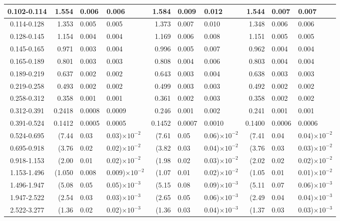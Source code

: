 \begin{table}[h]
{\begin{tabular}{ | c | r@{$\pm$}l@{$\pm$}l | r@{$\pm$}l@{$\pm$}l |  r@{$\pm$}l@{$\pm$}l |  }
0.102-0.114 & 1.554&0.006&0.006 & 1.584&0.009&0.012 & 1.544&0.007&0.007 \\ \hline
0.114-0.128 & 1.353&0.005&0.005 & 1.373&0.007&0.010 & 1.348&0.006&0.006 \\ \hline
0.128-0.145 & 1.154&0.004&0.004 & 1.169&0.006&0.008 & 1.151&0.005&0.005 \\ \hline
0.145-0.165 & 0.971&0.003&0.004 & 0.996&0.005&0.007 & 0.962&0.004&0.004 \\ \hline
0.165-0.189 & 0.801&0.003&0.003 & 0.808&0.004&0.006 & 0.803&0.004&0.004 \\ \hline
0.189-0.219 & 0.637&0.002&0.002 & 0.643&0.003&0.004 & 0.638&0.003&0.003 \\ \hline
0.219-0.258 & 0.493&0.002&0.002 & 0.499&0.003&0.003 & 0.492&0.002&0.002 \\ \hline
0.258-0.312 & 0.358&0.001&0.001 & 0.361&0.002&0.003 & 0.358&0.002&0.002 \\ \hline
0.312-0.391 & 0.2418&0.0008&0.0009 & 0.246&0.001&0.002 & 0.241&0.001&0.001 \\ \hline
0.391-0.524 & 0.1412&0.0005&0.0005 & 0.1452&0.0007&0.0010 & 0.1400&0.0006&0.0006 \\ \hline
0.524-0.695 & (7.44&0.03&0.03)$\times 10^{-2}$ & (7.61&0.05&0.06)$\times 10^{-2}$ & (7.41&0.04&0.04)$\times 10^{-2}$ \\ \hline
0.695-0.918 & (3.76&0.02&0.02)$\times 10^{-2}$ & (3.82&0.03&0.04)$\times 10^{-2}$ & (3.76&0.03&0.03)$\times 10^{-2}$ \\ \hline
0.918-1.153 & (2.00&0.01&0.02)$\times 10^{-2}$ & (1.98&0.02&0.03)$\times 10^{-2}$ & (2.02&0.02&0.02)$\times 10^{-2}$ \\ \hline
1.153-1.496 & (1.050&0.008&0.009)$\times 10^{-2}$ & (1.07&0.01&0.02)$\times 10^{-2}$ & (1.05&0.01&0.01)$\times 10^{-2}$ \\ \hline
1.496-1.947 & (5.08&0.05&0.05)$\times 10^{-3}$ & (5.15&0.08&0.09)$\times 10^{-3}$ & (5.11&0.07&0.06)$\times 10^{-3}$ \\ \hline
1.947-2.522 & (2.54&0.03&0.03)$\times 10^{-3}$ & (2.65&0.05&0.06)$\times 10^{-3}$ & (2.49&0.04&0.04)$\times 10^{-3}$ \\ \hline
2.522-3.277 & (1.36&0.02&0.02)$\times 10^{-3}$ & (1.36&0.03&0.04)$\times 10^{-3}$ & (1.37&0.03&0.03)$\times 10^{-3}$ \\ \hline
\end{tabular}}
\end{table}


